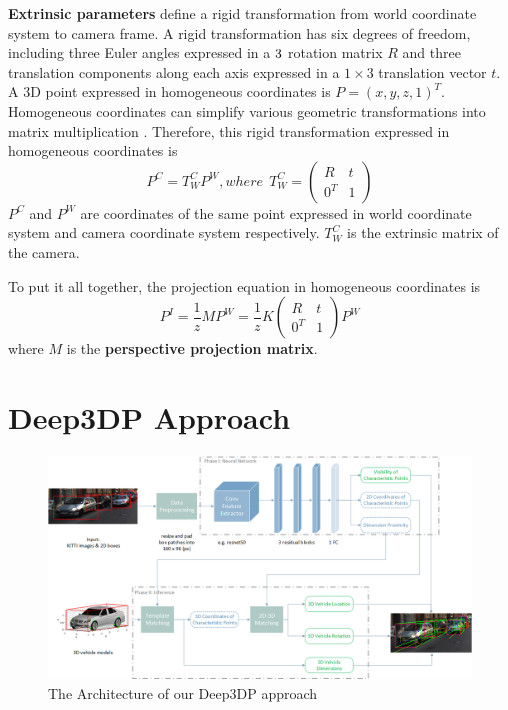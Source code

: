 \documentclass[a4paper,12pt]{article}
\begin{document}
\textbf{Extrinsic parameters} define a rigid transformation from world coordinate system to camera frame. A rigid transformation has six degrees of freedom, including three Euler angles expressed in a $3\time3$ rotation matrix $R$ and three translation components along each axis expressed in a $1\times3$ translation vector $t$. A 3D point expressed in homogeneous coordinates is $P=(x, y, z, 1)^T$. Homogeneous coordinates can simplify various geometric transformations into matrix multiplication \cite{Forsyth:2002:CVM:580035}.  Therefore, this rigid transformation expressed in homogeneous coordinates is 
\begin{equation}
\label{eq4}
P^{C} = T_W^C P^W, where ~~T_W^C = 
\begin{pmatrix}
	R & t\\ 
	0^T& 1
\end{pmatrix}
\end{equation}
$P^{C}$ and $P^W$ are coordinates of the same point expressed in world coordinate system and camera coordinate system respectively. $T_W^C$ is the extrinsic matrix of the camera.

To put it all together, the projection equation in homogeneous coordinates is 
\begin{equation}
\label{eq5}
P^I = \frac{1}{z} M P^W = \frac{1}{z} K
\begin{pmatrix}
R & t\\ 
0^T& 1
\end{pmatrix} P^W
\end{equation}
where $M$ is the \textbf{perspective projection matrix}.
\clearpage

\section{Deep3DP Approach}
\label{main_work}
\begin{figure}[h]		
	\includegraphics[width=1\textwidth]{app_archi_box_0522.png}
	\caption{The Architecture of our Deep3DP approach}
	\centering
	\label{figure:app_archi}
\end{figure}
\end{document}
